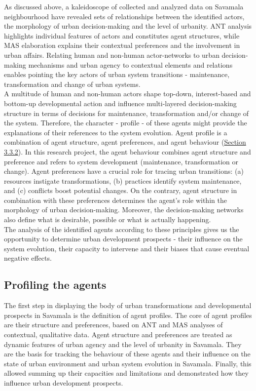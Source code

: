 \documentclass[11pt]{report}
\begin{document}
As discussed above, a kaleidoscope of collected and analyzed data on Savamala neighbourhood have revealed sets of relationships between the identified actors, the morphology of urban decision-making and the level of urbanity.
ANT analysis highlights individual features of actors and constitutes agent structures, while MAS elaboration explains their contextual preferences and the involvement in urban affairs.
Relating human and non-human actor-networks to urban decision- making mechanisms and urban agency to contextual elements and relations enables pointing the key actors of urban system  transitions - maintenance, transformation and change of urban systems.
\\

A multitude of human and non-human actors shape top-down, interest-based and bottom-up developmental action and influence multi-layered decision-making structure in terms of decisions for maintenance, transformation and/or change of the system. 
Therefore, the character - profile - of these agents might provide the explanations of their references to the system evolution.
Agent profile is a combination of agent structure, agent preferences, and agent behaviour (\href{Section 3.3.2}{Section 3.3.2}).
In this research project, the agent behaviour combines agent structure and preference and refers to system development (maintenance, transformation or change). 
Agent preferences have a crucial role for tracing urban transitions:
(a) resources instigate transformations,
(b) practices identify system maintenance,
and
(c) conflicts boost potential changes.
On the contrary, agent structure in combination with these preferences determines the agent's role within the morphology of urban decision-making.
Moreover, the decision-making networks also define what is desirable, possible or what is actually happening.
\\

The analysis of the identified agents according to these principles gives us the opportunity to determine urban development prospects - their influence on the system evolution, their capacity to intervene and their biases that cause eventual negative effects.

\subsection{Profiling the agents}

The first step in displaying the body of urban transformations and developmental prospects in Savamala is the definition of agent profiles.
The core of agent profiles are their structure and preferences, based on ANT and MAS analyses of contextual, qualitative data. Agent structure and preferences are treated as dynamic features of urban agency and the level of urbanity in Savamala.
They are the basis for tracking the behaviour of these agents and their influence on the state of urban environment and urban system evolution in Savamala.
Finally, this allowed summing up their capacities and limitations and demonstrated how they influence urban development prospects.
\\
\end{document}
